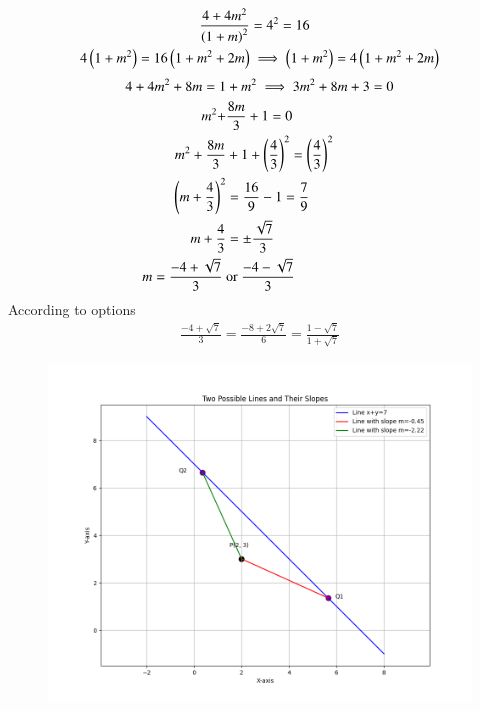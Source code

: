 \documentclass[journal]{IEEEtran}
\begin{document}
\begin{align}
\frac{4+4m^2}{\left(1+m\right)^2}&=4^2=16 \\
4\left(1+m^2\right)=16\left(1+m^2+2m\right) &\implies \left(1+m^2\right)=4\left(1+m^2+2m\right) 
\end{align}
\begin{align}
4+4m^2+8m=1&+m^2 \implies 3m^2+8m+3=0 \\
m^2+&\frac{8m}{3}+1=0 \\
m^2+\frac{8m}{3}&+1+\left(\frac{4}{3}\right)^2=\left(\frac{4}{3}\right)^2 \\
\left(m+\frac{4}{3}\right)^2&=\frac{16}{9}-1=\frac{7}{9} \\
m+\frac{4}{3}&=\pm\frac{\sqrt{7}}{3} \\
m=\frac{-4+\sqrt{7}}{3}\ &\text{or}\ \frac{-4-\sqrt{7}}{3}
\end{align}
According to options 
\begin{align}
    \frac{-4+\sqrt{7}}{3}=\frac{-8+2\sqrt{7}}{6}=\frac{1-\sqrt7}{1+\sqrt{7}}
\end{align}
\begin{figure}[h!]
   \centering
   \includegraphics[width=0.7\columnwidth]{figs/fig1.png}
   \caption{}
   \label{Figure}
\end{figure}
\end{document}
